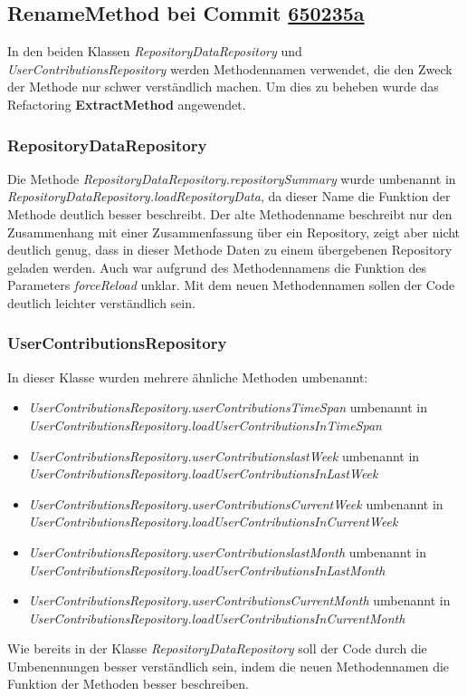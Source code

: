 \documentclass[12pt]{article}
\begin{document}
\subsection{RenameMethod bei Commit \href{https://github.com/lukaspanni/OpenSourceStats/commit/650235a5868f35cd0c641f0112b921ddead17a17} {650235a}}
\label{sec:RenameMethod_Repositories}

In den beiden Klassen \textit{RepositoryDataRepository} und \textit{UserContributionsRepository} werden Methodennamen verwendet, die den Zweck der Methode nur schwer verständlich machen. Um dies zu beheben wurde das Refactoring \textbf{ExtractMethod} angewendet.
\subsubsection*{RepositoryDataRepository}
Die Methode \textit{RepositoryDataRepository.repositorySummary} wurde umbenannt in \textit{RepositoryDataRepository.loadRepositoryData}, da dieser Name die Funktion der Methode deutlich besser beschreibt. Der alte Methodenname beschreibt nur den Zusammenhang mit einer Zusammenfassung über ein Repository, zeigt aber nicht deutlich genug, dass in dieser Methode Daten zu einem übergebenen Repository geladen werden. Auch war aufgrund des Methodennamens die Funktion des Parameters \textit{forceReload} unklar.
Mit dem neuen Methodennamen sollen der Code deutlich leichter verständlich sein.
\subsubsection*{UserContributionsRepository}
In dieser Klasse wurden mehrere ähnliche Methoden umbenannt:
\begin{itemize}
	\item{\textit{UserContributionsRepository.userContributionsTimeSpan} umbenannt in \textit{UserContributionsRepository.loadUserContributionsInTimeSpan}}
	\item{\textit{UserContributionsRepository.userContributionslastWeek} umbenannt in \textit{UserContributionsRepository.loadUserContributionsInLastWeek}}
	\item{\textit{UserContributionsRepository.userContributionsCurrentWeek} umbenannt in \textit{UserContributionsRepository.loadUserContributionsInCurrentWeek}}
	\item{\textit{UserContributionsRepository.userContributionslastMonth} umbenannt in \textit{UserContributionsRepository.loadUserContributionsInLastMonth}}
	\item{\textit{UserContributionsRepository.userContributionsCurrentMonth} umbenannt in \textit{UserContributionsRepository.loadUserContributionsInCurrentMonth}}
\end{itemize}
Wie bereits in der Klasse \textit{RepositoryDataRepository} soll der Code durch die Umbenennungen besser verständlich sein, indem die neuen Methodennamen die Funktion der Methoden besser beschreiben.
\end{document}
